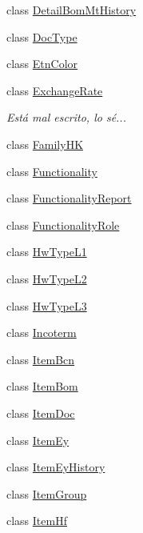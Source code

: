 \begin{DoxyCompactItemize}
class \mbox{\hyperlink{class_h_k_supply_1_1_models_1_1_detail_bom_mt_history}{Detail\+Bom\+Mt\+History}}
\item 
class \mbox{\hyperlink{class_h_k_supply_1_1_models_1_1_doc_type}{Doc\+Type}}
\item 
class \mbox{\hyperlink{class_h_k_supply_1_1_models_1_1_etn_color}{Etn\+Color}}
\item 
class \mbox{\hyperlink{class_h_k_supply_1_1_models_1_1_exchange_rate}{Exchange\+Rate}}
\begin{DoxyCompactList}\small\item\em Está mal escrito, lo sé... \end{DoxyCompactList}\item 
class \mbox{\hyperlink{class_h_k_supply_1_1_models_1_1_family_h_k}{Family\+HK}}
\item 
class \mbox{\hyperlink{class_h_k_supply_1_1_models_1_1_functionality}{Functionality}}
\item 
class \mbox{\hyperlink{class_h_k_supply_1_1_models_1_1_functionality_report}{Functionality\+Report}}
\item 
class \mbox{\hyperlink{class_h_k_supply_1_1_models_1_1_functionality_role}{Functionality\+Role}}
\item 
class \mbox{\hyperlink{class_h_k_supply_1_1_models_1_1_hw_type_l1}{Hw\+Type\+L1}}
\item 
class \mbox{\hyperlink{class_h_k_supply_1_1_models_1_1_hw_type_l2}{Hw\+Type\+L2}}
\item 
class \mbox{\hyperlink{class_h_k_supply_1_1_models_1_1_hw_type_l3}{Hw\+Type\+L3}}
\item 
class \mbox{\hyperlink{class_h_k_supply_1_1_models_1_1_incoterm}{Incoterm}}
\item 
class \mbox{\hyperlink{class_h_k_supply_1_1_models_1_1_item_bcn}{Item\+Bcn}}
\item 
class \mbox{\hyperlink{class_h_k_supply_1_1_models_1_1_item_bom}{Item\+Bom}}
\item 
class \mbox{\hyperlink{class_h_k_supply_1_1_models_1_1_item_doc}{Item\+Doc}}
\item 
class \mbox{\hyperlink{class_h_k_supply_1_1_models_1_1_item_ey}{Item\+Ey}}
\item 
class \mbox{\hyperlink{class_h_k_supply_1_1_models_1_1_item_ey_history}{Item\+Ey\+History}}
\item 
class \mbox{\hyperlink{class_h_k_supply_1_1_models_1_1_item_group}{Item\+Group}}
\item 
class \mbox{\hyperlink{class_h_k_supply_1_1_models_1_1_item_hf}{Item\+Hf}}

\end{DoxyCompactItemize}
